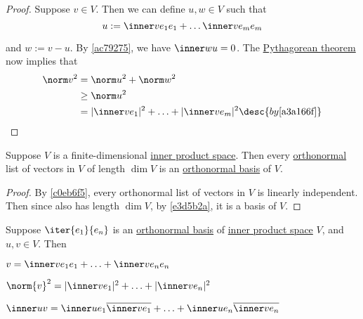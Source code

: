 \begin{proof}
  Suppose $v\in V$. Then we can define $u,w\in V$ such that
  $$
    u:=\inner v{e_1}e_1+\ldots\inner v{e_m}e_m
  $$

  and $w:=v-u$. By \autoref{ac79275}, we have $\inner wu=0$. The
  \href{c5e5d7d}{Pythagorean theorem} now implies that
  \begin{align*}
    \norm v^2 &=\norm u^2+\norm w^2                                                   \\
              &\geq\norm u^2                                                          \\
              &=|\inner v{e_1}|^2+\ldots+|\inner v{e_m}|^2\desc{by \autoref{a3a166f}}
  \end{align*}
\end{proof}

\label{aaecd1d}

Suppose $V$ is a finite-dimensional \href{b9935c8}{inner product space}. Then
every \href{d90fcb1}{orthonormal} list of vectors in $V$ of length
\href{cd4284b}{$\dim V$} is an \href{e112aa0}{orthonormal basis} of $V$.

\begin{proof}
  By \autoref{c0eb6f5}, every orthonormal list of vectors in $V$ is linearly
  independent. Then since also has length $\dim V$, by \autoref{e3d5b2a}, it is
  a basis of $V$.
\end{proof}

\label{b762d27}

Suppose $\iter{e_1}{e_n}$ is an \href{e112aa0}{orthonormal basis} of
\href{b9935c8}{inner product space} $V$, and $u,v\in V$. Then
\begin{enumerata}
  \item $v=\inner v{e_1}e_1+\ldots+\inner v{e_n}e_n$
  \item $\norm{v}^2=|\inner v{e_1}|^2+\ldots+|\inner v{e_n}|^2$
  \item $\inner uv=\inner u{e_1}\overline{\inner v{e_1}}+\ldots+\inner u{e_n}\overline{\inner v{e_n}}$
\end{enumerata}


